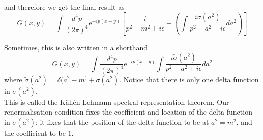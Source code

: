 \documentclass[11pt]{article}
\newcommand{\e}{\mathrm{e}}
\numberwithin{equation}{section}
\begin{document}
and therefore we get the final result as 
\begin{equation*}
    G(x,y) = \int \frac{d^4 p}{(2\pi)^4} \e^{-ip(x-y)} \left[ \frac{i}{p^2 - m^2 + i\epsilon}  +  \left(\int \frac{i\sigma(a^2)}{p^2 - a^2 + i\epsilon} da^2 \right) \right]
\end{equation*}

Sometimes, this is also written in a shorthand 
\begin{equation*}
    G(x,y) = \int \frac{d^4 p}{(2\pi)^4} \e^{-ip(x-y)}\int \frac{i\tilde\sigma(a^2)}{p^2 - a^2 + i\epsilon} da^2 
\end{equation*}
where \(\tilde \sigma(a^2) = \delta(a^2 - m^) + \sigma(a^2)\). Notice that there is only one delta function in \(\tilde\sigma(a^2)\).\\

This is called the K\"all\'en-Lehmann spectral representation theorem. Our renormalisation condition fixes the coefficient and location of the delta function in \(\tilde \sigma(a^2)\); it fixes that the position of the delta function to be at \(a^2 = m^2\), and the coefficient to be \(1\). \\
\end{document}
